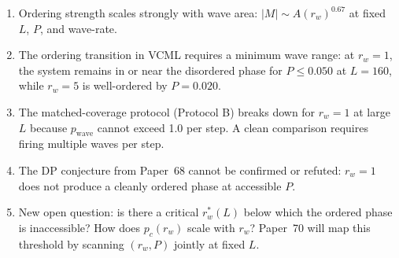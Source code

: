 \documentclass[twocolumn,10pt]{article}
\begin{document}
\begin{enumerate}
  \item Ordering strength scales strongly with wave area:
        $|M| \sim A(r_w)^{0.67}$ at fixed $L$, $P$, and wave-rate.
  \item The ordering transition in VCML requires a minimum wave range:
        at $r_w=1$, the system remains in or near the disordered phase for
        $P\leq0.050$ at $L=160$, while $r_w=5$ is well-ordered by $P=0.020$.
  \item The matched-coverage protocol (Protocol B) breaks down for $r_w=1$
        at large $L$ because $p_\mathrm{wave}$ cannot exceed 1.0 per step.
        A clean comparison requires firing multiple waves per step.
  \item The DP conjecture from Paper~68 cannot be confirmed or refuted:
        $r_w=1$ does not produce a cleanly ordered phase at accessible $P$.
  \item New open question: is there a critical $r_w^*(L)$ below which the
        ordered phase is inaccessible? How does $p_c(r_w)$ scale with $r_w$?
        Paper~70 will map this threshold by scanning $(r_w, P)$ jointly at
        fixed $L$.
\end{enumerate}
\end{document}
